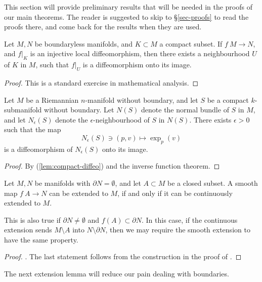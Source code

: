 This section will provide preliminary
results that will be needed in the proofs of our main theorems.
The reader is suggested to skip to \S\ref{sec-proofs}
to read the proofs there,
and come back for the results when they are used.

\begin{lemma}\label{lem:compact-diffeo}
Let $M,N$ be boundaryless manifolds, and $K\subset M$ a compact subset.
If $f\:M\to N$, and $f|_K$ is an injective local diffeomorphism,
then there exists a neighbourhood $U$ of $K$ in $M$,
such that $f|_U$ is a diffeomorphism onto its image.
\end{lemma}

\begin{proof}
This is a standard exercise in mathematical analysis.
\end{proof}

\begin{lemma}\label{lem:diffeo}
Let $M$ be a Riemannian $n$-manifold without boundary,
and let $S$ be a compact $k$-submanifold without boundary.
Let $N(S)$ denote the normal bundle of $S$ in $M$,
and let $N_\epsilon(S)$ denote the $\epsilon$-neighbourhood of $S$ in $N(S)$.
There exists $\epsilon>0$ such that the map
\[ N_\epsilon(S)\ni(p,v)\mapsto \exp_p(v) \]
is a diffeomorphism of $N_\epsilon(S)$ onto its image.
\end{lemma}

\begin{proof}
By (\ref{lem:compact-diffeo}) and the inverse function theorem. 
\end{proof}

\begin{lemma}\label{lem:whitney-extension}
Let $M,N$ be manifolds with $\partial N=\emptyset$,
and let $A\subset M$ be a closed subset.
A smooth map $f\:A\to N$ can be extended to $M$,
if and only if it can be continuously extended to $M$.

This is also true if $\partial N\neq\emptyset$ and $f(A)\subset\partial N$.
In this case, if the continuous extension sends $M\setminus A$ into $N\setminus\partial N$,
then we may require the smooth extension to have the same property.
\end{lemma}

\begin{proof}
\cite[Corollary~6.27]{lee}. The last statement follows from
the construction in the proof of \cite[Theorem~6.21]{lee}.
\end{proof}

The next extension lemma will reduce our pain
dealing with boundaries.

